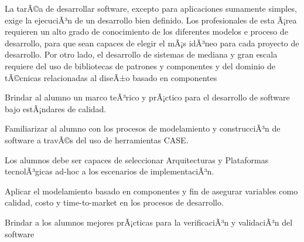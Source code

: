 \begin{syllabus}


\begin{justification}
La tarÃ©a de desarrollar software, excepto para aplicaciones sumamente simples, exige la ejecuciÃ³n de un desarrollo bien definido. Los profesionales de esta Ã¡rea requieren un alto grado de conocimiento de los diferentes modelos e proceso de desarrollo, para que sean capaces de elegir el mÃ¡s idÃ³neo para cada proyecto de desarrollo. Por otro lado, el desarrollo de sistemas de mediana y gran escala requiere del uso de bibliotecas de patrones y componentes y del dominio de tÃ©cnicas relacionadas al diseÃ±o basado en componentes
\end{justification}

\begin{goals}
\item Brindar al alumno un marco teÃ³rico y prÃ¡ctico para el desarrollo de software bajo estÃ¡ndares de calidad.
\item Familiarizar al alumno con los procesos de modelamiento y construcciÃ³n de software a travÃ©s del uso de herramientas CASE.
\item Los alumnos debe ser capaces de seleccionar Arquitecturas y Plataformas tecnolÃ³gicas ad-hoc a los escenarios de implementaciÃ³n.
\item Aplicar el modelamiento basado en componentes y fin de asegurar variables como calidad, costo y time-to-market en los procesos de desarrollo.
\item Brindar a los alumnos mejores prÃ¡cticas para la verificaciÃ³n y validaciÃ³n del software
\end{goals}

\begin{outcomes}
    \item {}
    \item {}
	\item {}
	\item {}
	\item {}
\end{outcomes}

\begin{competences}
    \item {} 
    \item {} 
    \item {}
	\item {}
	\item {}
	\item {}
	\item {}
	\item {}
	\item {}
	\item {}
	\item {}
\end{competences}


\end{syllabus}
